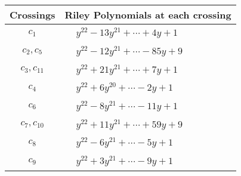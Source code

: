 \documentclass[1p]{elsarticle_modified}
\theoremstyle{definition}
\begin{document}
\begin{tabular}{m{50pt}|m{274pt}}
Crossings & \hspace{64pt}Riley Polynomials at each crossing \\
\hline $$\begin{aligned}c_{1}\end{aligned}$$&$\begin{aligned}
&y^{22}-13 y^{21}+\cdots+4 y+1
\end{aligned}$\\
\hline $$\begin{aligned}c_{2},c_{5}\end{aligned}$$&$\begin{aligned}
&y^{22}-12 y^{21}+\cdots-85 y+9
\end{aligned}$\\
\hline $$\begin{aligned}c_{3},c_{11}\end{aligned}$$&$\begin{aligned}
&y^{22}+21 y^{21}+\cdots+7 y+1
\end{aligned}$\\
\hline $$\begin{aligned}c_{4}\end{aligned}$$&$\begin{aligned}
&y^{22}+6 y^{20}+\cdots-2 y+1
\end{aligned}$\\
\hline $$\begin{aligned}c_{6}\end{aligned}$$&$\begin{aligned}
&y^{22}-8 y^{21}+\cdots-11 y+1
\end{aligned}$\\
\hline $$\begin{aligned}c_{7},c_{10}\end{aligned}$$&$\begin{aligned}
&y^{22}+11 y^{21}+\cdots+59 y+9
\end{aligned}$\\
\hline $$\begin{aligned}c_{8}\end{aligned}$$&$\begin{aligned}
&y^{22}-6 y^{21}+\cdots-5 y+1
\end{aligned}$\\
\hline $$\begin{aligned}c_{9}\end{aligned}$$&$\begin{aligned}
&y^{22}+3 y^{21}+\cdots-9 y+1
\end{aligned}$\\
\hline
\end{tabular}\\~\\
\end{document}
